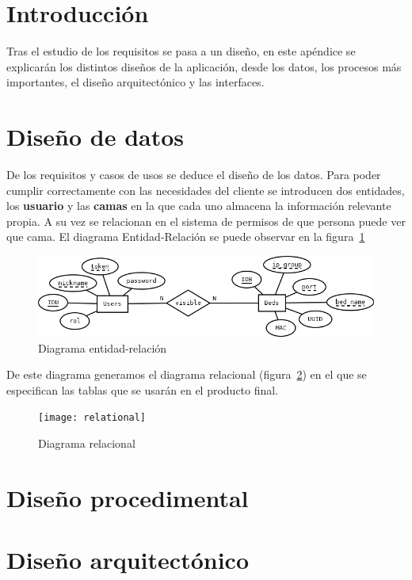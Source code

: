 
\section{Introducción}

Tras el estudio de los requisitos se pasa a un diseño, en este apéndice se explicarán los distintos diseños de la aplicación, desde los datos, los procesos más importantes, el diseño arquitectónico y las interfaces.

\section{Diseño de datos}

De los requisitos y casos de usos se deduce el diseño de los datos. Para poder cumplir correctamente con las necesidades del cliente se introducen dos entidades, los \textbf{usuario} y las \textbf{camas} en la que cada uno almacena la información relevante propia. A su vez se relacionan en el sistema de permisos de que persona puede ver que cama. El diagrama Entidad-Relación se puede observar en la figura~\ref{fig:erDia}

\begin{figure}
	\centering
	\includegraphics[width=\textwidth]{img/entidad-relacion.png}
	\caption{Diagrama entidad-relación}
	\label{fig:erDia}
\end{figure}

De este diagrama generamos el diagrama relacional (figura~\ref{fig:relational}) en el que se especifican las tablas que se usarán en el producto final.

\begin{figure}
	\centering
	\texttt{[image: relational]}
	\caption{Diagrama relacional}
	\label{fig:relational}
\end{figure}


\section{Diseño procedimental}

\section{Diseño arquitectónico}

